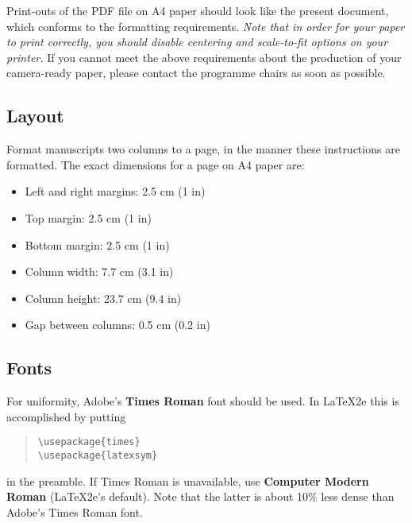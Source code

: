 \documentclass[11pt]{article}
\begin{document}
Print-outs of the PDF file on A4 paper should look like the present document,
which conforms to the formatting requirements. {\em Note that in order for
your paper to print correctly, you should disable centering and scale-to-fit
options on your printer.} If you cannot meet the above requirements about the
production of your camera-ready paper, please contact the programme chairs
as soon as possible.


\subsection{Layout}
\label{ssec:layout}

Format manuscripts two columns to a page, in the manner these
instructions are formatted. The exact dimensions for a page on
A4 paper are:


\begin{itemize}
\itemsep 0mm
\item Left and right margins: 2.5 cm (1 in)
\item Top margin: 2.5 cm (1 in)
\item Bottom margin: 2.5 cm (1 in)
\item Column width: 7.7 cm (3.1 in)
\item Column height: 23.7 cm (9.4 in)
\item Gap between columns: 0.5 cm (0.2 in)
\end{itemize}


\subsection{Fonts}

For uniformity, Adobe's {\bf Times Roman} font should be
used. In \LaTeX2e{} this is accomplished by putting

\begin{quote}
\begin{verbatim}
\usepackage{times}
\usepackage{latexsym}
\end{verbatim}
\end{quote}
in the preamble. If Times Roman is unavailable, use {\bf Computer
  Modern Roman} (\LaTeX2e{}'s default).  Note that the latter is about
  10\% less dense than Adobe's Times Roman font.
\end{document}
